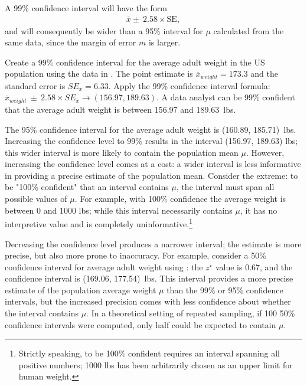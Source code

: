 A 99\% confidence interval will have the form 
\begin{align}
	\overline{x} \pm \ 2.58 \times \text{SE},
\end{align}
 and will consequently be wider than a 95\% interval for $\mu$ calculated from the same data, since the margin of error $m$ is larger.


\begin{examplewrap}
\begin{nexample}{Create a 99\% confidence interval for the average adult weight in the US population using the data in . The point estimate is $\overline{x}_{weight} = 173.3$ and the standard error is $SE_{\overline{x}} = 6.33$.}
Apply the 99\% confidence interval formula: $\overline{x}_{weight}\ \pm\ 2.58 \times  SE_{\overline{x}} \rightarrow (156.97, 189.63)$. A data analyst can be 99\% confident that the average adult weight is between 156.97 and 189.63~lbs.
\end{nexample}
\end{examplewrap}

The 95\% confidence interval for the average adult weight is (160.89, 185.71)~lbs. Increasing the confidence level to 99\% results in the interval (156.97, 189.63) lbs; this wider interval is more likely to contain the population mean $\mu$. However, increasing the confidence level comes at a cost: a wider interval is less informative in providing a precise estimate of the population mean. Consider the extreme: to be "100\% confident" that an interval contains $\mu$, the interval must span all possible values of $\mu$. For example, with 100\% confidence the average weight is between 0 and 1000 lbs; while this interval necessarily contains $\mu$, it has no interpretive value and is completely uninformative.\footnote{Strictly speaking, to be 100\% confident requires an interval spanning all positive numbers; 1000 lbs has been arbitrarily chosen as an upper limit for human weight.} 

Decreasing the confidence level produces a narrower interval; the estimate is more precise, but also more prone to inaccuracy. For example, consider a 50\% confidence interval for average adult weight using : the $z^{\star}$ value is 0.67, and the confidence interval is (169.06, 177.54)~lbs. This interval provides a more precise estimate of the population average weight $\mu$ than the 99\% or 95\% confidence intervals, but the increased precision comes with less confidence about whether the interval contains $\mu$. In a theoretical setting of repeated sampling, if 100 50\% confidence intervals were computed, only half could be expected to contain $\mu$.


